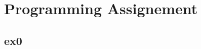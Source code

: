 \documentclass[12pt]{article}
\begin{document}
\section* {Programming Assignement}

\subsection*{ex0}
\end{document}
